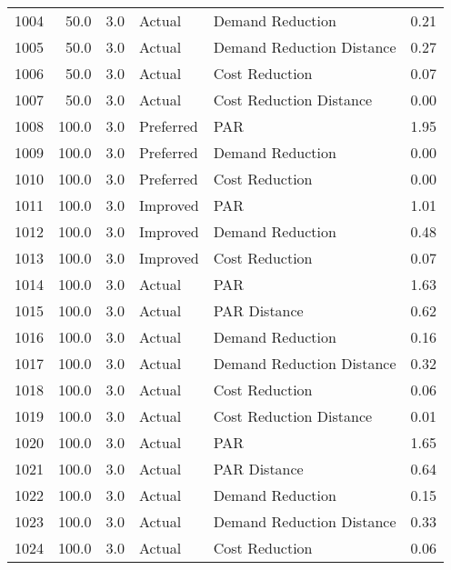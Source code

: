 \begin{longtable}{lrrllr}
1004 &         50.0 &     3.0 &         Actual &           Demand Reduction &   0.21 \\
1005 &         50.0 &     3.0 &         Actual &  Demand Reduction Distance &   0.27 \\
1006 &         50.0 &     3.0 &         Actual &             Cost Reduction &   0.07 \\
1007 &         50.0 &     3.0 &         Actual &    Cost Reduction Distance &   0.00 \\
1008 &        100.0 &     3.0 &      Preferred &                        PAR &   1.95 \\
1009 &        100.0 &     3.0 &      Preferred &           Demand Reduction &   0.00 \\
1010 &        100.0 &     3.0 &      Preferred &             Cost Reduction &   0.00 \\
1011 &        100.0 &     3.0 &       Improved &                        PAR &   1.01 \\
1012 &        100.0 &     3.0 &       Improved &           Demand Reduction &   0.48 \\
1013 &        100.0 &     3.0 &       Improved &             Cost Reduction &   0.07 \\
1014 &        100.0 &     3.0 &         Actual &                        PAR &   1.63 \\
1015 &        100.0 &     3.0 &         Actual &               PAR Distance &   0.62 \\
1016 &        100.0 &     3.0 &         Actual &           Demand Reduction &   0.16 \\
1017 &        100.0 &     3.0 &         Actual &  Demand Reduction Distance &   0.32 \\
1018 &        100.0 &     3.0 &         Actual &             Cost Reduction &   0.06 \\
1019 &        100.0 &     3.0 &         Actual &    Cost Reduction Distance &   0.01 \\
1020 &        100.0 &     3.0 &         Actual &                        PAR &   1.65 \\
1021 &        100.0 &     3.0 &         Actual &               PAR Distance &   0.64 \\
1022 &        100.0 &     3.0 &         Actual &           Demand Reduction &   0.15 \\
1023 &        100.0 &     3.0 &         Actual &  Demand Reduction Distance &   0.33 \\
1024 &        100.0 &     3.0 &         Actual &             Cost Reduction &   0.06 \\

\end{longtable}
